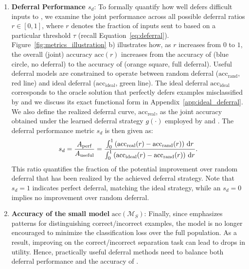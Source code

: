 \begin{enumerate}[leftmargin=1.25em]
    
    \item \textbf{Deferral Performance $s_d$}:  
To formally quantify how well \smallmodel defers difficult inputs to \bigmodel, we examine the joint performance across all possible deferral ratios $r \in [0,1]$, where $r$ denotes the fraction of inputs sent to \bigmodel based on a particular threshold $\tau$ (recall Equation~\eqref{eq:deferral}). Figure~\ref{fig:metrics_illustration} b) illustrates how, as $r$ increases from $0$ to $1$, the overall (joint) accuracy $\text{acc}(r)$ increases from the accuracy of \smallmodel (blue circle, no deferral) to the accuracy of \bigmodel (orange square, full deferral). Useful deferral models are constrained to operate between random deferral ($\mathrm{acc}_{\mathrm{rand}}$, red line) and ideal deferral ($\mathrm{acc}_{\mathrm{ideal}}$, green line). The ideal deferral $\mathrm{acc}_{\mathrm{ideal}}$ corresponds to the oracle solution that perfectly defers examples misclassified by \smallmodel and we discuss its exact functional form in Appendix~\ref{app:ideal_deferral}. We also define the realized deferral curve, $\mathrm{acc}_{\mathrm{real}}$, as the joint accuracy obtained under the learned deferral strategy $g(\cdot)$ employed by \smallmodel and \bigmodel. The deferral performance metric \( s_d \) is then given as:
\begin{equation}
\label{eq:deferral_performance}
\small
s_d = \frac{A_{\mathrm{perf}}}{A_{\mathrm{useful}}} = \frac{\int_{0}^{1} \left( \mathrm{acc}_{\mathrm{real}}(r) - \mathrm{acc}_{\mathrm{rand}}(r) \right) \, \mathrm{d}r}{\int_{0}^{1} \left( \mathrm{acc}_{\mathrm{ideal}}(r) - \mathrm{acc}_{\mathrm{rand}}(r) \right) \, \mathrm{d}r}.
\end{equation}
This ratio quantifies the fraction of the potential improvement over random deferral that has been realized by the achieved deferral strategy. Note that $s_d = 1$ indicates perfect deferral, matching the ideal strategy, while an $s_d = 0$ implies no improvement over random deferral.
    \item \textbf{Accuracy of the small model} $\text{acc}(\mathcal{M}_S)$: Finally, since \loss emphasizes patterns for distinguishing correct/incorrect examples, the model is no longer encouraged to minimize the classification loss over the full population. As a result, improving on the correct/incorrect separation task can lead to drops in utility. Hence, practically useful deferral methods need to balance both deferral performance and the accuracy of \smallmodel.
\end{enumerate}

